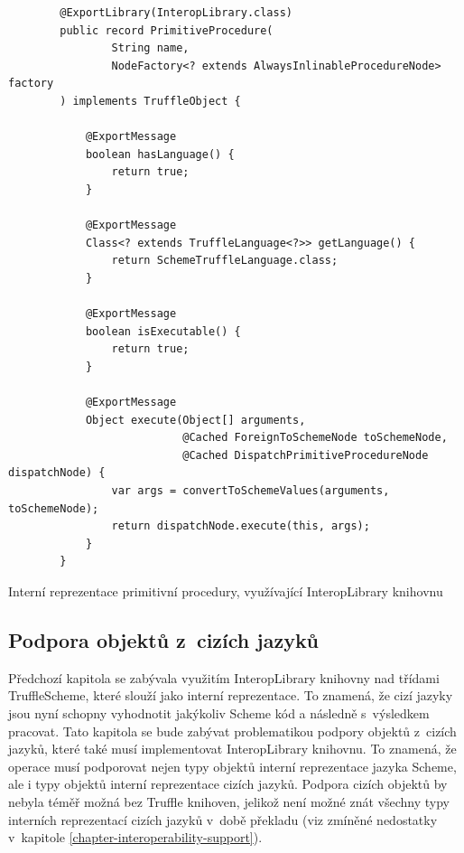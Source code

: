 \documentclass[
  master,
  biblatex,
  figures=true,
  theorems,
  sourcecodes,
  glossaries,
  index
]{kidiplom}
\begin{document}
\begin{listing} [H]
    \begin{verbatim}
        @ExportLibrary(InteropLibrary.class)
        public record PrimitiveProcedure(
                String name,
                NodeFactory<? extends AlwaysInlinableProcedureNode> factory
        ) implements TruffleObject {
        
            @ExportMessage
            boolean hasLanguage() {
                return true;
            }
        
            @ExportMessage
            Class<? extends TruffleLanguage<?>> getLanguage() {
                return SchemeTruffleLanguage.class;
            }
        
            @ExportMessage
            boolean isExecutable() {
                return true;
            }
        
            @ExportMessage
            Object execute(Object[] arguments,
                           @Cached ForeignToSchemeNode toSchemeNode,
                           @Cached DispatchPrimitiveProcedureNode dispatchNode) {
                var args = convertToSchemeValues(arguments, toSchemeNode);
                return dispatchNode.execute(this, args);
            }
        }
    \end{verbatim}
    \caption{Interní reprezentace primitivní procedury, využívající \mbox{InteropLibrary} knihovnu}
    \label{PrimitiveProcedure}
\end{listing}


\subsection{Podpora objektů z~cizích jazyků}
 Předchozí kapitola se zabývala využitím InteropLibrary knihovny nad třídami TruffleScheme, které slouží jako interní reprezentace. To znamená, že cizí jazyky jsou nyní schopny vyhodnotit jakýkoliv Scheme kód a následně s~výsledkem pracovat. Tato kapitola se bude zabývat problematikou podpory objektů z~cizích jazyků, které také musí implementovat InteropLibrary knihovnu. To znamená, že operace musí podporovat nejen typy objektů interní reprezentace jazyka Scheme, ale i typy objektů interní reprezentace cizích jazyků. Podpora cizích objektů by nebyla téměř možná bez Truffle knihoven, jelikož není možné znát všechny typy interních reprezentací cizích jazyků v~době překladu (viz zmíněné nedostatky v~kapitole \ref{chapter-interoperability-support}).  
\end{document}
